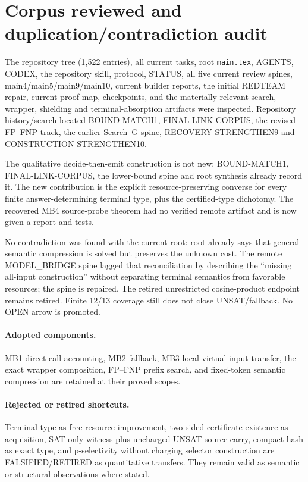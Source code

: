 \documentclass[11pt]{article}
\begin{document}
\section{Corpus reviewed and duplication/contradiction audit}
The repository tree (1,522 entries), all current tasks, root
\texttt{main.tex}, AGENTS, CODEX, the repository skill, protocol, STATUS,
all five current review spines, main4/main5/main9/main10, current builder
reports, the initial REDTEAM repair, current proof map, checkpoints, and
the materially relevant search, wrapper, shielding and terminal-absorption
artifacts were inspected.  Repository history/search located BOUND-MATCH1,
FINAL-LINK-CORPUS, the revised FP--FNP track, the earlier Search--G spine,
RECOVERY-STRENGTHEN9 and CONSTRUCTION-STRENGTHEN10.

The qualitative decide-then-emit construction is not new: BOUND-MATCH1,
FINAL-LINK-CORPUS, the lower-bound spine and root synthesis already record
it.  The new contribution is the explicit resource-preserving converse for
every finite answer-determining terminal type, plus the certified-type
dichotomy.  The recovered MB4 source-probe theorem had no verified remote
artifact and is now given a report and tests.

No contradiction was found with the current root: root already says that
general semantic compression is solved but preserves the unknown cost.  The
remote MODEL\_BRIDGE spine lagged that reconciliation by describing the
``missing all-input construction'' without separating terminal semantics
from favorable resources; the spine is repaired.  The retired unrestricted
cosine-product endpoint remains retired.  Finite 12/13 coverage still does
not close UNSAT/fallback.  No OPEN arrow is promoted.

\paragraph{Adopted components.}
MB1 direct-call accounting, MB2 fallback, MB3 local virtual-input transfer,
the exact wrapper composition, FP--FNP prefix search, and fixed-token
semantic compression are retained at their proved scopes.

\paragraph{Rejected or retired shortcuts.}
Terminal type as free resource improvement, two-sided certificate existence
as acquisition, SAT-only witness plus uncharged UNSAT source carry, compact
hash as exact type, and p-selectivity without charging selector construction
are FALSIFIED/RETIRED as quantitative transfers.  They remain valid as
semantic or structural observations where stated.
\end{document}
